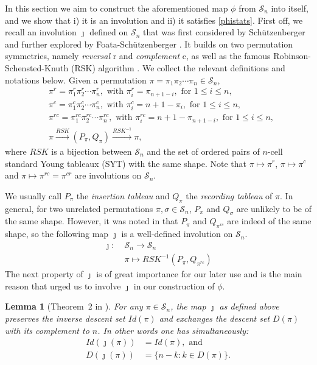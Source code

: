 \documentclass[12pt]{amsart}
\numberwithin{equation}{section}
\theoremstyle{plain}
\newtheorem{lemma}[theorem]{Lemma}
\theoremstyle{definition}
\def\SS{\mathcal{S}}
\begin{document}
In this section we aim to construct the aforementioned map $\phi$ from $\SS_n$ into itself, and we show that i) it is an involution and ii) it satisfies \eqref{phistats}. First off, we recall an involution $\jmath$ defined on $\SS_n$ that was first considered by Sch\"{u}tzenberger \cite{Schu} and further explored by Foata-Sch\"{u}tzenberger \cite{FS}. It builds on two permutation symmetries, namely \emph{reversal} r and \emph{complement} c, as well as the famous Robinson-Schensted-Knuth (RSK) algorithm \cite[$\S$7.11]{Stan}. We collect the relevant definitions and notations below. Given a permutation $\pi=\pi_1\pi_2\cdots \pi_n\in\SS_n$,
\begin{align*}
&\pi^r=\pi_1^r\pi_2^r\cdots\pi_n^r, \text{ with } \pi^{r}_i=\pi_{n+1-i}, \text{ for }1\leq i\leq n,\\
&\pi^c=\pi_1^c\pi_2^c\cdots\pi_n^c, \text{ with } \pi^{c}_i=n+1-\pi_i, \text{ for }1\leq i\leq n,\\
&\pi^{rc}=\pi_1^{rc}\pi_2^{rc}\cdots\pi_n^{rc}, \text{ with } \pi^{rc}_i=n+1-\pi_{n+1-i}, \text{ for }1\leq i\leq n,\\
&\pi\stackrel{RSK}{\longrightarrow} (P_{\pi},Q_{\pi}) \stackrel{RSK^{-1}}{\longrightarrow} \pi,
\end{align*}
where $RSK$ is a bijection between $\SS_n$ and the set of ordered pairs of $n$-cell standard Young tableaux (SYT) with the same shape. Note that $\pi\mapsto \pi^r$, $\pi\mapsto \pi^c$ and $\pi\mapsto \pi^{rc}=\pi^{cr}$ are involutions on $\SS_n$.

We usually call $P_{\pi}$ the \emph{insertion tableau} and $Q_{\pi}$ the \emph{recording tableau} of $\pi$. In general, for two unrelated permutations $\pi,\sigma\in\SS_n$, $P_{\pi}$ and $Q_{\sigma}$ are unlikely to be of the same shape. However, it was noted in \cite[Prop.~5.2]{FS} that $P_{\pi}$ and $Q_{\pi^{rc}}$ are indeed of the same shape, so the following map $\jmath$ is a well-defined involution on $\SS_n$.
\begin{align*}
\jmath:\;& \SS_n\rightarrow\SS_n\\
& \pi\mapsto RSK^{-1}(P_{\pi},Q_{\pi^{rc}})
\end{align*}
The next property of $\jmath$ is of great importance for our later use and is the main reason that urged us to involve $\jmath$ in our construction of $\phi$.
\begin{lemma}[Theorem~2 in \cite{FS}]
For any $\pi\in\SS_n$, the map $\jmath$ as defined above preserves the inverse descent set $Id(\pi)$ and exchanges the descent set $D(\pi)$ with its complement to $n$. In other words one has simultaneously:
\begin{align}
\label{jId}Id(\jmath(\pi))&=Id(\pi), \text{ and}\\
\label{jD}D(\jmath(\pi))&=\{n-k: k\in D(\pi)\}.
\end{align}
\end{lemma}
\end{document}
